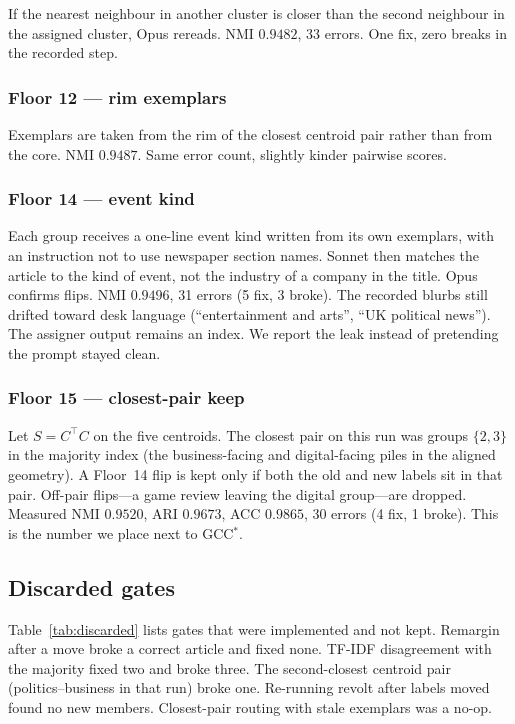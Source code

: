 \documentclass[11pt,a4paper]{article}
\begin{document}
If the nearest neighbour in another cluster is closer than
the second neighbour in the assigned cluster, Opus rereads.
NMI $0.9482$, 33 errors. One fix, zero breaks in the
recorded step.

\subsubsection{Floor 12 --- rim exemplars}

Exemplars are taken from the rim of the closest centroid
pair rather than from the core. NMI $0.9487$. Same error
count, slightly kinder pairwise scores.

\subsubsection{Floor 14 --- event kind}

Each group receives a one-line event kind written from its
own exemplars, with an instruction not to use newspaper
section names. Sonnet then matches the article to the kind
of event, not the industry of a company in the title. Opus
confirms flips. NMI $0.9496$, 31 errors (5 fix, 3 broke).
The recorded blurbs still drifted toward desk language
(``entertainment and arts'', ``UK political news''). The
assigner output remains an index. We report the leak
instead of pretending the prompt stayed clean.

\subsubsection{Floor 15 --- closest-pair keep}

Let $S=C^\top C$ on the five centroids. The closest pair on
this run was groups $\{2,3\}$ in the majority index (the
business-facing and digital-facing piles in the aligned
geometry). A Floor~14 flip is kept only if both the old and
new labels sit in that pair. Off-pair flips---a game review
leaving the digital group---are dropped. Measured NMI
$0.9520$, ARI $0.9673$, ACC $0.9865$, 30 errors (4 fix, 1
broke). This is the number we place next to GCC$^*$.

\subsection{Discarded gates}

Table~\ref{tab:discarded} lists gates that were implemented
and not kept. Remargin after a move broke a correct article
and fixed none. TF-IDF disagreement with the majority fixed
two and broke three. The second-closest centroid pair
(politics--business in that run) broke one. Re-running
revolt after labels moved found no new members. Closest-pair
routing with stale exemplars was a no-op.
\end{document}
